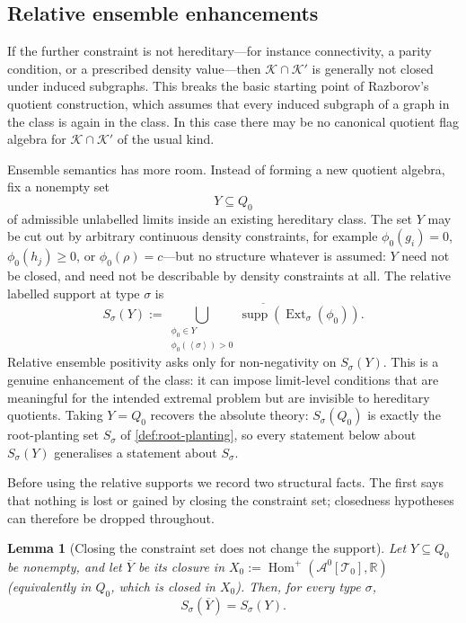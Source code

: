 \documentclass[11pt]{article}
\newtheorem{lemma}[lemma]{Lemma}
\theoremstyle{definition}
\newcommand{\R}{\mathbb{R}}
\newcommand{\A}{\mathcal{A}}
\newcommand{\K}{\mathcal{K}}
\newcommand{\T}{\mathcal{T}}
\newcommand{\Homp}{\operatorname{Hom}^{+}}
\newcommand{\Ext}{\operatorname{Ext}}
\newcommand{\supp}{\operatorname{supp}}
\newcommand{\brak}[1]{\left\langle #1\right\rangle}
\begin{document}
\subsection{Relative ensemble enhancements}

If the further constraint is not hereditary---for instance connectivity, a parity
condition, or a prescribed density value---then $\K\cap\K'$ is generally not closed under
induced subgraphs.  This breaks the basic starting point of Razborov's quotient
construction, which assumes that every induced subgraph of a graph in the class is again
in the class.  In this case there may be no canonical quotient flag algebra for
$\K\cap\K'$ of the usual kind.

Ensemble semantics has more room.  Instead of forming a new quotient algebra, fix a
nonempty set
\[
  Y\subseteq Q_0
\]
of admissible unlabelled limits inside an existing hereditary class.  The set $Y$ may
be cut out by arbitrary continuous density constraints, for example
$\phi_0(g_i)=0$, $\phi_0(h_j)\ge0$, or $\phi_0(\rho)=c$---but no structure whatever is
assumed: $Y$ need not be closed, and need not be describable by density constraints at
all.  The relative labelled support at type $\sigma$ is
\[
  S_\sigma(Y):=
  \overline{
  \bigcup_{\substack{\phi_0\in Y\\ \phi_0(\brak\sigma)>0}}
  \supp(\Ext_\sigma(\phi_0))
  }.
\]
Relative ensemble positivity asks only for non-negativity on $S_\sigma(Y)$.  This is a
genuine enhancement of the class: it can impose limit-level conditions that are meaningful for
the intended extremal problem but are invisible to hereditary quotients.  Taking $Y=Q_0$
recovers the absolute theory: $S_\sigma(Q_0)$ is exactly the root-planting set $S_\sigma$
of \cref{def:root-planting}, so every statement below about $S_\sigma(Y)$ generalises a
statement about $S_\sigma$.

Before using the relative supports we record two structural facts.  The first says that
nothing is lost or gained by closing the constraint set; closedness hypotheses can
therefore be dropped throughout.

\begin{lemma}[Closing the constraint set does not change the support]\label{lem:relative-closure}
Let $Y\subseteq Q_0$ be nonempty, and let $\overline Y$ be its closure in
$X_0:=\Homp(\A^0[\T_0],\R)$ (equivalently in $Q_0$, which is closed in $X_0$).  Then, for
every type $\sigma$,
\[
  S_\sigma(\overline Y)=S_\sigma(Y).
\]
\end{lemma}
\end{document}
